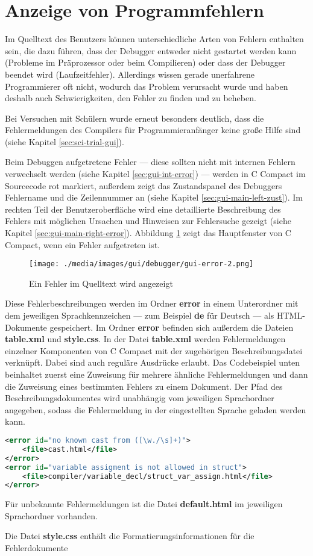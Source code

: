 

\section{Anzeige von Programmfehlern}
\label{sec:deb-error}
Im Quelltext des Benutzers können unterschiedliche Arten von Fehlern enthalten sein, die dazu führen, dass der Debugger entweder nicht gestartet werden kann (Probleme im Präprozessor oder beim Compilieren) oder dass der Debugger beendet wird (Laufzeitfehler). Allerdings wissen gerade unerfahrene Programmierer oft nicht, wodurch das Problem verursacht wurde und haben deshalb auch Schwierigkeiten, den Fehler zu finden und zu beheben.

Bei Versuchen mit Schülern wurde erneut besonders deutlich, dass die Fehlermeldungen des Compilers für Programmieranfänger keine große Hilfe sind (siehe Kapitel \ref{sec:sci-trial-gui}).

Beim Debuggen aufgetretene Fehler --- diese sollten nicht mit internen Fehlern verwechselt werden (siehe Kapitel \ref{sec:gui-int-error}) --- werden in C Compact im Sourcecode rot markiert, außerdem zeigt das Zustandspanel des Debuggers Fehlername und die Zeilennummer an (siehe Kapitel \ref{sec:gui-main-left-zust}). Im rechten Teil der Benutzeroberfläche wird eine detaillierte Beschreibung des Fehlers mit möglichen Ursachen und Hinweisen zur Fehlersuche gezeigt (siehe Kapitel \ref{sec:gui-main-right-error}). Abbildung \ref{fig:deb-error-gui} zeigt das Hauptfenster von C Compact, wenn ein Fehler aufgetreten ist.

\begin{figure}[h!]
\centering
\texttt{[image: ./media/images/gui/debugger/gui-error-2.png]}
\caption{Ein Fehler im Quelltext wird angezeigt}\label{fig:deb-error-gui}
\end{figure}

Diese Fehlerbeschreibungen werden im Ordner \textbf{error} in einem Unterordner mit dem jeweiligen Sprachkennzeichen --- zum Beispiel \textbf{de} für Deutsch --- als HTML-Dokumente gespeichert. Im Ordner \textbf{error} befinden sich außerdem die Dateien \textbf{table.xml} und \textbf{style.css}. In der Datei \textbf{table.xml} werden Fehlermeldungen einzelner Komponenten von C Compact mit der zugehörigen Beschreibungsdatei verknüpft. Dabei sind auch reguläre Ausdrücke erlaubt. Das Codebeispiel unten beinhaltet zuerst eine Zuweisung für mehrere ähnliche Fehlermeldungen und dann die Zuweisung eines bestimmten Fehlers zu einem Dokument. Der Pfad des Beschreibungsdokumentes wird unabhängig vom jeweiligen Sprachordner angegeben, sodass die Fehlermeldung in der eingestellten Sprache geladen werden kann.
\begin{lstlisting}[language=XML]
<error id="no known cast from ([\w./\s]+)">
	<file>cast.html</file>
</error>
<error id="variable assigment is not allowed in struct">
	<file>compiler/variable_decl/struct_var_assign.html</file>
</error>
\end{lstlisting}

Für unbekannte Fehlermeldungen ist die Datei \textbf{default.html} im jeweiligen Sprachordner vorhanden.

Die Datei \textbf{style.css} enthält die Formatierungsinformationen für die Fehlerdokumente


